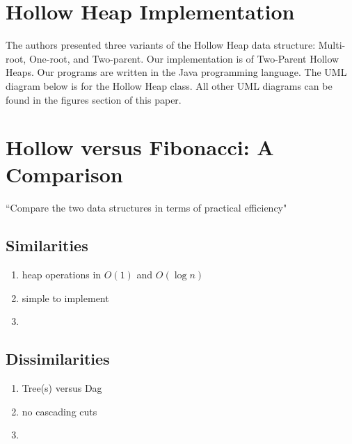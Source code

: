\documentclass[letter,10pt]{article}
\begin{document}
\section{Hollow Heap Implementation} 
The authors presented three variants of the Hollow Heap data structure: Multi-root, One-root, and Two-parent. Our implementation is of Two-Parent Hollow Heaps. Our programs are written in the Java programming language. The UML diagram below is for the Hollow Heap class. All other UML diagrams can be found in the figures section of this paper. 

\section{Hollow versus Fibonacci: A Comparison}
``Compare the two data structures in terms of practical efficiency"
\subsection{Similarities}
\begin{enumerate}
    \item heap operations in $O(1)$ and $O(\log n)$
    \item simple to implement
    \item
\end{enumerate}

\subsection{Dissimilarities}
\begin{enumerate}
    \item Tree(s) versus Dag
    \item no cascading cuts
    \item 
\end{enumerate}
\end{document}
